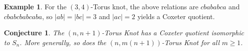 \documentclass{article}
\newtheorem{conjecture}[theorem]{Conjecture}
\theoremstyle{definition}
\newtheorem{example}[theorem]{Example}
\begin{document}
\begin{example}
For the $(3,4)$-Torus knot, the above relations are $cbababca$ and $cbabcbabcaba$, so $|ab| = |bc| = 3$ and $|ac|=2$ yields a Coxeter quotient.
\end{example}

\begin{conjecture}
The $(n, n+1)$-Torus Knot has a Coxeter quotient isomorphic to $S_n$. More generally, so does the $(n, m(n+1))$-Torus Knot for all $m \geq 1$.
\end{conjecture}
\end{document}
